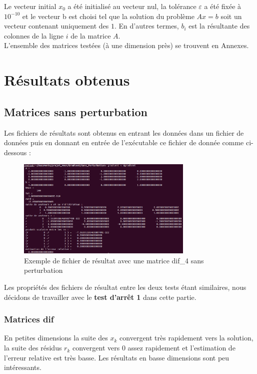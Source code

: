 \documentclass[12,french]{report}
\begin{document}
Le vecteur initial $x_{0}$ a été initialisé au vecteur nul, la tolérance $\varepsilon$ a été fixée à $10^{-10}$ et le vecteur b est choisi tel que la solution du problème $Ax=b$ soit un vecteur contenant uniquement des $1$. En d'autres termes, $b_{i}$ est la résultante des colonnes de la ligne $i$ de la matrice $A$.\\

L'ensemble des matrices testées (à une dimension près) se trouvent en Annexes.

\section{Résultats obtenus}

\subsection{Matrices sans perturbation}

Les fichiers de résultats sont obtenus en entrant les données dans un fichier de données puis en donnant en entrée de l’exécutable ce fichier de donnée comme ci-dessous :
\begin{figure}[H]
	\centering
	\includegraphics[width=0.75\textwidth]{./Images/dif_4.res}
	\caption{Exemple de fichier de résultat avec une matrice dif\_4 sans perturbation}
\end{figure}

Les propriétés des fichiers de résultat entre les deux tests étant similaires, nous décidons de travailler avec le \textbf{test d'arrêt 1} dans cette partie.


\subsubsection{Matrices dif}

En petites dimensions la suite des $x_{k}$ convergent très rapidement vers la solution, la suite des résidus $r_{k}$ convergent vers 0 assez rapidement et l'estimation de l'erreur relative est très basse. Les résultats en basse dimensions sont peu intéressants.\\
\end{document}
